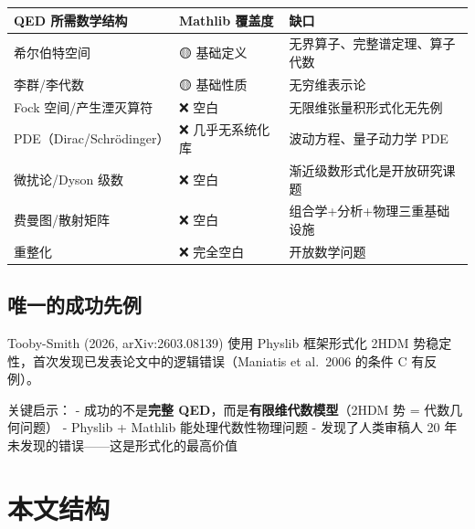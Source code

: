 \documentclass[
  11pt,
  a4paper,
]{ctexrep}
\newcounter{none} %
\begin{document}
{\def\LTcaptype{none} %
\begin{longtable}[]{@{}
  >{\raggedright\arraybackslash}p{}
  >{\centering\arraybackslash}p{}
  >{\raggedright\arraybackslash}p{}@{}}
\toprule\noalign{}
\begin{minipage}[b]{\linewidth}\raggedright
QED 所需数学结构
\end{minipage} & \begin{minipage}[b]{\linewidth}\centering
Mathlib 覆盖度
\end{minipage} & \begin{minipage}[b]{\linewidth}\raggedright
缺口
\end{minipage} \\
\midrule\noalign{}
\endhead
\bottomrule\noalign{}
\endlastfoot
希尔伯特空间 & 🟡 基础定义 & 无界算子、完整谱定理、算子代数 \\
李群/李代数 & 🟡 基础性质 & 无穷维表示论 \\
Fock 空间/产生湮灭算符 & ❌ 空白 & 无限维张量积形式化无先例 \\
PDE（Dirac/Schrödinger） & ❌ 几乎无系统化库 & 波动方程、量子动力学
PDE \\
微扰论/Dyson 级数 & ❌ 空白 & 渐近级数形式化是开放研究课题 \\
费曼图/散射矩阵 & ❌ 空白 & 组合学+分析+物理三重基础设施 \\
重整化 & ❌ 完全空白 & 开放数学问题 \\
\end{longtable}
}

\subsection*{唯一的成功先例}\label{ux552fux4e00ux7684ux6210ux529fux5148ux4f8b}

Tooby-Smith (2026, arXiv:2603.08139) 使用 Physlib 框架形式化 2HDM
势稳定性，首次发现已发表论文中的逻辑错误（Maniatis et al.~2006 的条件 C
有反例）。

关键启示： - 成功的不是\textbf{完整
QED}，而是\textbf{有限维代数模型}（2HDM 势 = 代数几何问题） - Physlib +
Mathlib 能处理代数性物理问题 - 发现了人类审稿人 20
年未发现的错误------这是形式化的最高价值

\section*{本文结构}\label{ux672cux6587ux7ed3ux6784}
\end{document}
